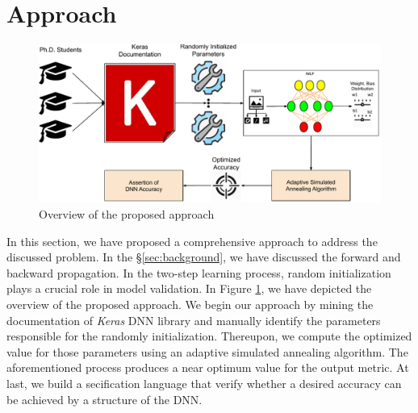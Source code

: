 \section{Approach}
\label{sec:approach}
\begin{figure}
	\includegraphics[width=0.85\linewidth]{approach}
	\centering
	\caption{Overview of the proposed approach}
	\label{fig:flow}
\end{figure}
In this section, we have proposed a comprehensive approach to address the discussed problem. 
In the \S\ref{sec:background}, we have discussed the forward and backward propagation. In the two-step learning process, random initialization plays a crucial role in model validation. 
In Figure \ref{fig:flow}, we have depicted the overview of the proposed approach. We begin our approach by mining the documentation of \emph{Keras} DNN library and manually identify the parameters responsible for the randomly initialization. Thereupon, we compute the optimized value for those parameters using an adaptive simulated annealing algorithm. The aforementioned process produces a near optimum value for the output metric. At last, we build a secification language that verify whether a desired accuracy can be achieved by a structure of the DNN.
